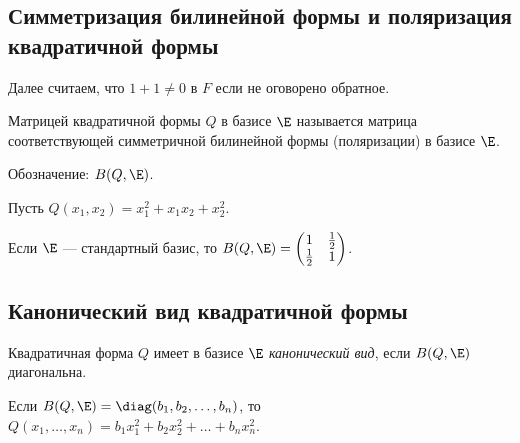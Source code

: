 \subsection{Симметризация билинейной формы и поляризация квадратичной формы}

\begin{comment}~
    \begin{enumerate}
        \item Билинейная форма $\sigma(x, y) = \frac{1}{2} \left(\beta(x, y) + \beta(y, x)\right)$ называется \textit{симметризацией} билинейной формы $\beta$.

            Если $B$ и $S$ --- матрицы билинейных форм $\beta$ и $\sigma$ в некотором базисе, то $S = \frac{1}{2} (B + B^{T})$.

        \item Симметричная билинейная форма $\beta(x, y) = \frac{1}{2} \left[Q(x + y) - Q(x) - Q(y)\right]$ называется \textit{поляризацией} квадратичной формы $Q$.
    \end{enumerate}
\end{comment}

Далее считаем, что $1 + 1 \neq 0$ в $F$ если не оговорено обратное.

\begin{definition}
    Матрицей квадратичной формы $Q$ в базисе $\E$ называется матрица соответствующей симметричной билинейной формы (поляризации) в базисе $\E$.

    Обозначение: $B(Q, \E)$.
\end{definition}

\begin{example}
    Пусть $Q(x_1, x_2) = x_1^2 + x_1 x_2 + x_2^2$.

    Если $\E$ --- стандартный базис, то $B(Q, \E) = \begin{pmatrix} 1 & \frac{1}{2} \\ \frac{1}{2} & 1 \end{pmatrix}$.
\end{example}


\subsection{Канонический вид квадратичной формы}

\begin{definition}
    Квадратичная форма $Q$ имеет в базисе $\E$ \textit{канонический вид}, если $B(Q, \E)$ диагональна.

    Если $B(Q, \E) = \diag(b_1, b_2, \dots, b_n)$, то $Q(x_1, \dots, x_n) = b_1 x_1^2 + b_2 x_2^2 + \dots + b_n x_n^2$.
\end{definition}


